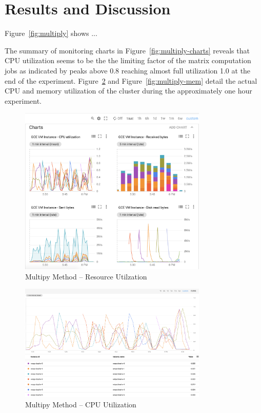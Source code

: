 \documentclass{prog_report}
\begin{document}
\section{Results and Discussion}

Figure~\ref{fig:multiply} shows ...


The summary of monitoring charts in Figure~\ref{fig:multiply-charts} reveals that CPU utilization seems to be the the limiting factor of the matrix computation jobs as indicated by peaks above 0.8 reaching almost full utilization 1.0 at the end of the experiment.
Figure~\ref{fig:multiply-cpu} and Figure~\ref{fig:multiply-mem} detail the actual CPU and memory utilization of the cluster during the approximately one hour experiment.

\begin{figure}[h]
    \centering
    \includegraphics[width=0.8\textwidth]{img/multiply-resources}
    \caption{Multipy Method – Resource Utilzation}
    \label{fig:multiply-resources}
\end{figure}

\begin{figure}[h]
    \centering
    \includegraphics[width=0.8\textwidth]{img/multiply-cpu}
    \caption{Multipy Method – CPU Utilization}
    \label{fig:multiply-cpu}
\end{figure}
\end{document}
